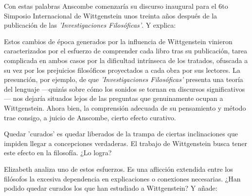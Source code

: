 \autocite[p.~181]{twocuts} 
Con estas palabras Anscombe comenzaría su discurso inaugural para el 6to
Simposio Internacional de Wittgenstein unos treinta años después de la
publicación de las \emph{'Investigaciones Filosóficas'}. Y explica:
\autocite[p.~181]{twocuts}

Estos cambios de época generados por la influencia de Wittgenstein vinieron
caracterizados por el esfuerzo de comprender cada libro tras su publicación,
tarea complicada en ambos casos por la dificultad intrínseca de los tratados,
ofuscada a su vez por los prejuicios filosóficos proyectados a cada obra por sus
lectores. La presunción, por ejemplo, de que \emph{'Investigaciones
  Filosóficas'} presenta una teoría del lenguaje ---quizás sobre cómo los
sonidos se tornan en discursos significativos--- nos dejaría situados lejos de
las preguntas que genuinamente ocupan a
Wittgenstein.\autocite[cf.~][p.~183]{twocuts} Ahora bien, la comprensión
adecuada de su pensamiento y método trae consigo, a juicio de Anscombe, cierto
efecto curativo.

Quedar 'curados' es quedar liberados de la trampa de ciertas inclinaciones que
impiden llegar a concepciones verdaderas. El trabajo de Wittgenstein busca tener
este efecto en la filosofía. ¿Lo logra?

Elizabeth analiza uno de estos esfuerzos. Es una aflicción extendida entre los
filósofos la excesiva dependencia en explicaciones o conexiones necesarias. ¿Han
podido quedar curados los que han estudiado a Wittgenstein? Y añade:

